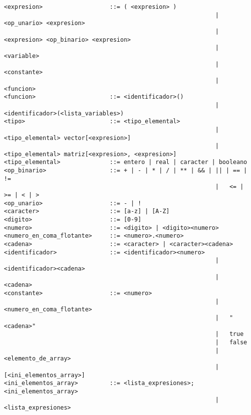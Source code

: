 \begin{verbatim}
<expresion>                   ::= ( <expresion> )
															| 	<op_unario> <expresion>
															| 	<expresion> <op_binario> <expresion>
															| 	<variable>
															| 	<constante>
															| 	<funcion>
<funcion>                     ::= <identificador>()
															| 	<identificador>(<lista_variables>)
<tipo>                        ::= <tipo_elemental>
															| 	<tipo_elemental> vector[<expresion>]
															| 	<tipo_elemental> matriz[<expresion>, <expresion>]
<tipo_elemental>              ::= entero | real | caracter | booleano
<op_binario>                  ::= + | - | * | / | ** | && | || | == | !=
															| 	<= | >= | < | >
<op_unario>                   ::= - | !
<caracter>                    ::= [a-z] | [A-Z]
<digito>                      ::= [0-9]
<numero>                      ::= <digito> | <digito><numero>
<numero_en_coma_flotante>     ::= <numero>.<numero>
<cadena>                      ::= <caracter> | <caracter><cadena>
<identificador>               ::= <identificador><numero>
															| 	<identificador><cadena>
															| 	<cadena>
<constante>                   ::= <numero>
															| 	<numero_en_coma_flotante>
															| 	"<cadena>"
															| 	true
															| 	false
															| 	<elemento_de_array>
															| 	[<ini_elementos_array>]
<ini_elementos_array>         ::= <lista_expresiones>; <ini_elementos_array>
															| 	<lista_expresiones>
\end{verbatim}


